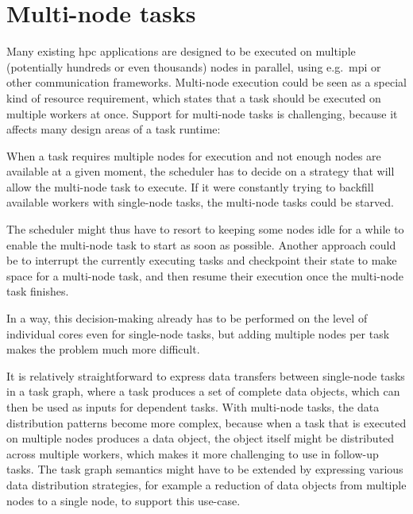 \section{Multi-node tasks}
\label{sec:multinode-tasks}
Many existing \gls{hpc} applications are designed to be executed on multiple
(potentially hundreds or even thousands) nodes in parallel, using e.g.\ \gls{mpi}
or other communication frameworks. Multi-node execution could be seen as a special
kind of resource requirement, which states that a task should be executed on multiple workers at
once. Support for multi-node tasks is challenging, because it affects many design areas of a task
runtime:
\begin{description}[wide=0pt]
	\item[Scheduling] When a task requires multiple nodes for execution and not enough nodes are available at a given
		moment, the scheduler has to decide on a strategy that will allow the multi-node task to execute.
		If it were constantly trying to backfill available workers with single-node tasks, the multi-node
		tasks could be starved.

		The scheduler might thus have to resort to keeping some nodes idle for a while to enable the
		multi-node task to start as soon as possible. Another approach could be to interrupt the currently
		executing tasks and checkpoint their state to make space for a multi-node task, and then resume
		their execution once the multi-node task finishes.

		In a way, this decision-making already has to be performed on the level of individual cores even
		for single-node tasks, but adding multiple nodes per task makes the problem much more difficult.
	\item[Data transfers] It is relatively straightforward to express data transfers between single-node tasks in a task
		graph, where a task produces a set of complete data objects, which can then be used as inputs for
		dependent tasks. With multi-node tasks, the data distribution patterns become more complex, because
		when a task that is executed on multiple nodes produces a data object, the object itself might be
		distributed across multiple workers, which makes it more challenging to use in follow-up tasks. The
		task graph semantics might have to be extended by expressing various data distribution strategies,
		for example a reduction of data objects from multiple nodes to a single node, to support this
		use-case.


\end{description}
